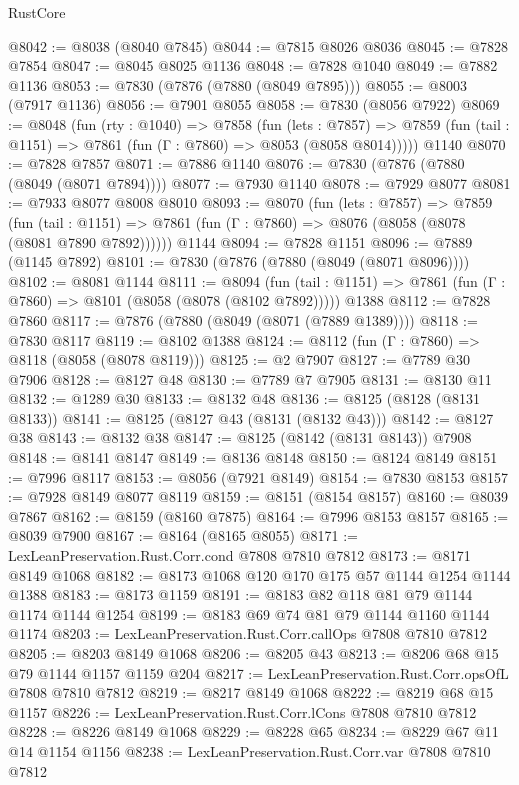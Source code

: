 \begin{lexlean}{RustCore}
\begin{coremodule}
@8042 := @8038 (@8040 @7845)
@8044 := @7815 @8026 @8036
@8045 := @7828 @7854
@8047 := @8045 @8025 @1136
@8048 := @7828 @1040
@8049 := @7882 @1136
@8053 := @7830 (@7876 (@7880 (@8049 @7895)))
@8055 := @8003 (@7917 @1136)
@8056 := @7901 @8055
@8058 := @7830 (@8056 @7922)
@8069 := @8048
    (fun (rty : @1040) =>
    @7858
      (fun (lets : @7857) =>
      @7859 (fun (tail : @1151) => @7861 (fun (Γ : @7860) => @8053 (@8058 @8014)))))
    @1140
@8070 := @7828 @7857
@8071 := @7886 @1140
@8076 := @7830 (@7876 (@7880 (@8049 (@8071 @7894))))
@8077 := @7930 @1140
@8078 := @7929 @8077
@8081 := @7933 @8077 @8008 @8010
@8093 := @8070
    (fun (lets : @7857) =>
    @7859
      (fun (tail : @1151) => @7861 (fun (Γ : @7860) => @8076 (@8058 (@8078 (@8081 @7890 @7892))))))
    @1144
@8094 := @7828 @1151
@8096 := @7889 (@1145 @7892)
@8101 := @7830 (@7876 (@7880 (@8049 (@8071 @8096))))
@8102 := @8081 @1144
@8111 := @8094
    (fun (tail : @1151) => @7861 (fun (Γ : @7860) => @8101 (@8058 (@8078 (@8102 @7892)))))
    @1388
@8112 := @7828 @7860
@8117 := @7876 (@7880 (@8049 (@8071 (@7889 @1389))))
@8118 := @7830 @8117
@8119 := @8102 @1388
@8124 := @8112 (fun (Γ : @7860) => @8118 (@8058 (@8078 @8119)))
@8125 := @2 @7907
@8127 := @7789 @30 @7906
@8128 := @8127 @48
@8130 := @7789 @7 @7905
@8131 := @8130 @11
@8132 := @1289 @30
@8133 := @8132 @48
@8136 := @8125 (@8128 (@8131 @8133))
@8141 := @8125 (@8127 @43 (@8131 (@8132 @43)))
@8142 := @8127 @38
@8143 := @8132 @38
@8147 := @8125 (@8142 (@8131 @8143)) @7908
@8148 := @8141 @8147
@8149 := @8136 @8148
@8150 := @8124 @8149
@8151 := @7996 @8117
@8153 := @8056 (@7921 @8149)
@8154 := @7830 @8153
@8157 := @7928 @8149 @8077 @8119
@8159 := @8151 (@8154 @8157)
@8160 := @8039 @7867
@8162 := @8159 (@8160 @7875)
@8164 := @7996 @8153 @8157
@8165 := @8039 @7900
@8167 := @8164 (@8165 @8055)
@8171 := LexLeanPreservation.Rust.Corr.cond @7808 @7810 @7812
@8173 := @8171 @8149 @1068
@8182 := @8173 @1068 @120 @170 @175 @57 @1144 @1254 @1144 @1388
@8183 := @8173 @1159
@8191 := @8183 @82 @118 @81 @79 @1144 @1174 @1144 @1254
@8199 := @8183 @69 @74 @81 @79 @1144 @1160 @1144 @1174
@8203 := LexLeanPreservation.Rust.Corr.callOps @7808 @7810 @7812
@8205 := @8203 @8149 @1068
@8206 := @8205 @43
@8213 := @8206 @68 @15 @79 @1144 @1157 @1159 @204
@8217 := LexLeanPreservation.Rust.Corr.opsOfL @7808 @7810 @7812
@8219 := @8217 @8149 @1068
@8222 := @8219 @68 @15 @1157
@8226 := LexLeanPreservation.Rust.Corr.lCons @7808 @7810 @7812
@8228 := @8226 @8149 @1068
@8229 := @8228 @65
@8234 := @8229 @67 @11 @14 @1154 @1156
@8238 := LexLeanPreservation.Rust.Corr.var @7808 @7810 @7812

\end{coremodule}
\end{lexlean}
